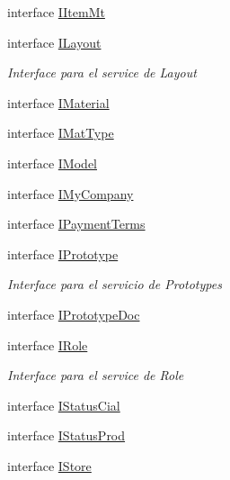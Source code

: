 \begin{DoxyCompactItemize}
\item 
interface \mbox{\hyperlink{interface_h_k_supply_1_1_services_1_1_interfaces_1_1_i_item_mt}{I\+Item\+Mt}}
\item 
interface \mbox{\hyperlink{interface_h_k_supply_1_1_services_1_1_interfaces_1_1_i_layout}{I\+Layout}}
\begin{DoxyCompactList}\small\item\em Interface para el service de Layout \end{DoxyCompactList}\item 
interface \mbox{\hyperlink{interface_h_k_supply_1_1_services_1_1_interfaces_1_1_i_material}{I\+Material}}
\item 
interface \mbox{\hyperlink{interface_h_k_supply_1_1_services_1_1_interfaces_1_1_i_mat_type}{I\+Mat\+Type}}
\item 
interface \mbox{\hyperlink{interface_h_k_supply_1_1_services_1_1_interfaces_1_1_i_model}{I\+Model}}
\item 
interface \mbox{\hyperlink{interface_h_k_supply_1_1_services_1_1_interfaces_1_1_i_my_company}{I\+My\+Company}}
\item 
interface \mbox{\hyperlink{interface_h_k_supply_1_1_services_1_1_interfaces_1_1_i_payment_terms}{I\+Payment\+Terms}}
\item 
interface \mbox{\hyperlink{interface_h_k_supply_1_1_services_1_1_interfaces_1_1_i_prototype}{I\+Prototype}}
\begin{DoxyCompactList}\small\item\em Interface para el servicio de Prototypes \end{DoxyCompactList}\item 
interface \mbox{\hyperlink{interface_h_k_supply_1_1_services_1_1_interfaces_1_1_i_prototype_doc}{I\+Prototype\+Doc}}
\item 
interface \mbox{\hyperlink{interface_h_k_supply_1_1_services_1_1_interfaces_1_1_i_role}{I\+Role}}
\begin{DoxyCompactList}\small\item\em Interface para el service de Role \end{DoxyCompactList}\item 
interface \mbox{\hyperlink{interface_h_k_supply_1_1_services_1_1_interfaces_1_1_i_status_cial}{I\+Status\+Cial}}
\item 
interface \mbox{\hyperlink{interface_h_k_supply_1_1_services_1_1_interfaces_1_1_i_status_prod}{I\+Status\+Prod}}
\item 
interface \mbox{\hyperlink{interface_h_k_supply_1_1_services_1_1_interfaces_1_1_i_store}{I\+Store}}

\end{DoxyCompactItemize}
